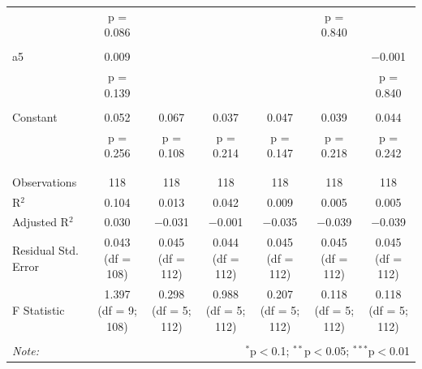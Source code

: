 \begin{table}[!htbp]
\begin{tabular}{@{\extracolsep{5pt}}lcccccc}
  & p = 0.086 &  &  &  & p = 0.840 &  \\ 
  & & & & & & \\ 
 a5 & 0.009 &  &  &  &  & $-$0.001 \\ 
  & p = 0.139 &  &  &  &  & p = 0.840 \\ 
  & & & & & & \\ 
 Constant & 0.052 & 0.067 & 0.037 & 0.047 & 0.039 & 0.044 \\ 
  & p = 0.256 & p = 0.108 & p = 0.214 & p = 0.147 & p = 0.218 & p = 0.242 \\ 
  & & & & & & \\ 
\hline \\[-1.8ex] 
Observations & 118 & 118 & 118 & 118 & 118 & 118 \\ 
R$^{2}$ & 0.104 & 0.013 & 0.042 & 0.009 & 0.005 & 0.005 \\ 
Adjusted R$^{2}$ & 0.030 & $-$0.031 & $-$0.001 & $-$0.035 & $-$0.039 & $-$0.039 \\ 
Residual Std. Error & 0.043 (df = 108) & 0.045 (df = 112) & 0.044 (df = 112) & 0.045 (df = 112) & 0.045 (df = 112) & 0.045 (df = 112) \\ 
F Statistic & 1.397 (df = 9; 108) & 0.298 (df = 5; 112) & 0.988 (df = 5; 112) & 0.207 (df = 5; 112) & 0.118 (df = 5; 112) & 0.118 (df = 5; 112) \\ 
\hline 
\hline \\[-1.8ex] 
\textit{Note:}  & \multicolumn{6}{r}{$^{*}$p$<$0.1; $^{**}$p$<$0.05; $^{***}$p$<$0.01} \\ 
\end{tabular} 
\end{table}


